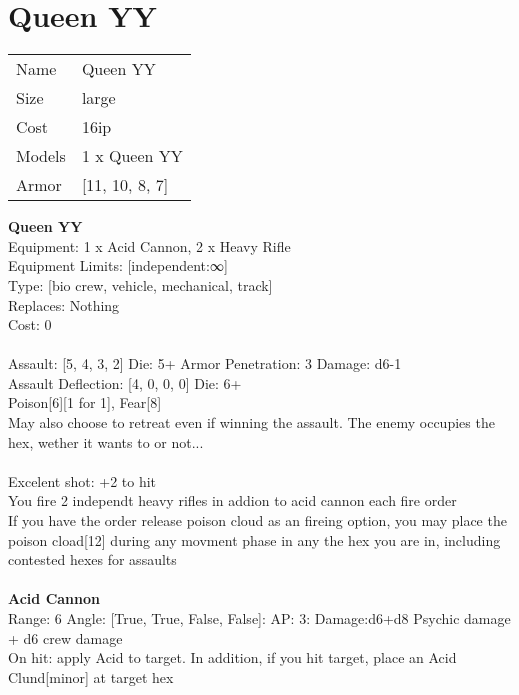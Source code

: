 \pagebreak\pagebreak

\section{ Queen YY }

\begin{tabular}{ll}
  Name & Queen YY \\
  Size & large\\
  Cost & 16ip\\
  Models & 1 x Queen YY\\
  Armor & [11, 10, 8, 7]\\
\end{tabular}

\noindent 

{\bf Queen YY } \\
Equipment: 1 x Acid Cannon, 2 x Heavy Rifle \\
Equipment Limits: [independent:∞] \\
Type: [bio crew, vehicle, mechanical, track] \\
Replaces: Nothing \\
Cost: 0\\
\ \\
Assault: [5, 4, 3, 2] Die: 5+ Armor Penetration: 3 Damage: d6-1 \\
Assault Deflection: [4, 0, 0, 0] Die: 6+\\
\indent Poison[6][1 for 1], Fear[8]\\ 
May also choose to retreat even if winning the assault. The enemy occupies the hex, wether it wants to or not...\\ 
 
\ \\
Excelent shot: +2 to hit\\ 
You fire 2 independt heavy rifles in addion to acid cannon each fire order\\ 
If you have the order release poison cloud as an fireing option, you may place the poison cload[12] during any movment phase in any the hex you are in, including contested hexes for assaults\\ 

\ \\
{\bf Acid Cannon } \\



Range: 6  Angle: [True, True, False, False]: AP: 3: Damage:d6+d8 Psychic damage + d6 crew damage \\
On hit: apply Acid to target. In addition, if you hit target, place an Acid Clund[minor] at target hex\\ 




